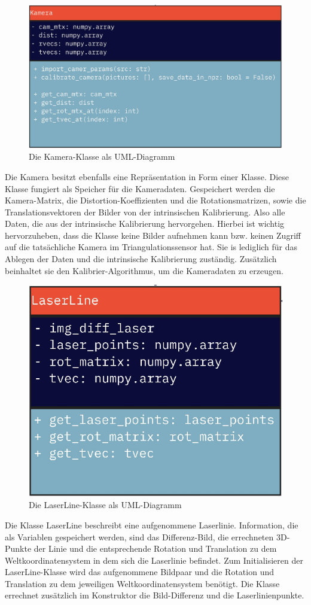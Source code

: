 		\begin{figure}[h]
			\centering
			\includegraphics[width=0.7\linewidth]{img/hauptteil/software/Kamera_UML.png}
			\caption{Die Kamera-Klasse als UML-Diagramm}
			\label{fig:kamera_uml}
		\end{figure}
		Die Kamera besitzt ebenfalls eine Repräsentation in Form einer Klasse. Diese Klasse fungiert als Speicher für die Kameradaten. Gespeichert werden die Kamera-Matrix, die Distortion-Koeffizienten und die Rotationsmatrizen, sowie die Translationsvektoren der Bilder von der intrinsischen Kalibrierung. Also alle Daten, die aus der intrinsische Kalibrierung hervorgehen. Hierbei ist wichtig hervorzuheben, dass die Klasse keine Bilder aufnehmen kann bzw. keinen Zugriff auf die tatsächliche Kamera im Triangulationssensor hat. Sie is lediglich für das Ablegen der Daten und die intrinsische Kalibrierung zuständig. Zusätzlich beinhaltet sie den Kalibrier-Algorithmus, um die Kameradaten zu erzeugen. 
		\newpage
		\begin{figure}[h]
			\centering
			\includegraphics[width=0.35\linewidth]{img/hauptteil/software/LaserLine_UML.png}
			\caption{Die LaserLine-Klasse als UML-Diagramm}
			\label{fig:laser_line_uml}
		\end{figure}
		Die Klasse LaserLine beschreibt eine aufgenommene Laserlinie. Information, die als Variablen gespeichert werden, sind das Differenz-Bild, die errechneten 3D-Punkte der Linie und die entsprechende Rotation und Translation zu dem Weltkoordinatensystem in dem sich die Laserlinie befindet. Zum Initialisieren der LaserLine-Klasse wird das aufgenommene Bildpaar und die Rotation und Translation zu dem jeweiligen Weltkoordinatensystem benötigt. Die Klasse errechnet zusätzlich im Konstruktor die Bild-Differenz und die Laserlinienpunkte.
		
